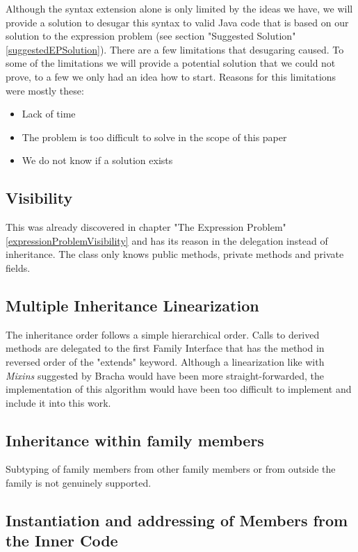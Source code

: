 \documentclass{report}
\begin{document}
Although the syntax extension alone is only limited by the ideas we have, we will provide a solution to desugar this syntax to valid Java code that is based on our solution to the expression problem (see section "Suggested Solution" \ref{suggestedEPSolution}). There are a few limitations that desugaring caused. To some of the limitations we will provide a potential solution that we could not prove, to a few we only had an idea how to start. Reasons for this limitations were mostly these:
\begin{itemize}
  \item Lack of time
  \item The problem is too difficult to solve in the scope of this paper
  \item We do not know if a solution exists
\end{itemize}

\subsection{Visibility}

This was already discovered in chapter "The Expression Problem" \ref{expressionProblemVisibility} and has its reason in the delegation instead of inheritance.
The class only knows public methods, private methods and private fields.

\subsection{Multiple Inheritance Linearization}

The inheritance order follows a simple hierarchical order. Calls to derived methods are delegated to the first Family Interface that has the method in reversed order of the "extends" keyword. Although a linearization like with \emph{Mixins} suggested by Bracha \cite{Bracha-Mixin-1990} would have been more straight-forwarded, the implementation of this algorithm would have been too difficult to implement and include it into this work.

\subsection{Inheritance within family members}

Subtyping of family members from other family members or from outside the family is not genuinely supported.

\subsection{Instantiation and addressing of Members from the Inner Code}
\end{document}
